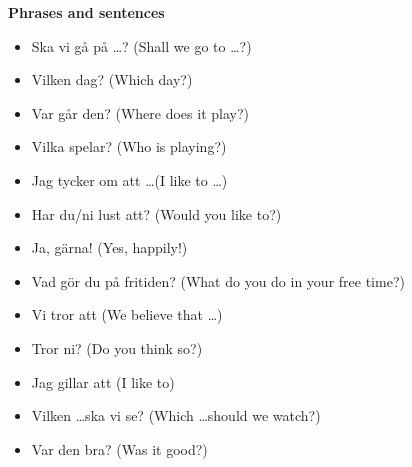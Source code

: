 
\begin{flushleft}
    \textbf{Phrases and sentences}
    \begin{itemize}
        \item Ska vi gå på \ldots? (Shall we go to \ldots?)
        \item Vilken dag? (Which day?)
        \item Var går den? (Where does it play?)
        \item Vilka spelar? (Who is playing?)
        \item Jag tycker om att \ldots (I like to \ldots)
        \item Har du/ni lust att? (Would you like to?)
        \item Ja, gärna! (Yes, happily!)
        \item Vad gör du på fritiden? (What do you do in your free time?)
        \item Vi tror att (We believe that \ldots)
        \item Tror ni? (Do you think so?)
        \item Jag gillar att (I like to)
        \item Vilken \ldots ska vi se? (Which \ldots should we watch?)
        \item Var den bra? (Was it good?)
    \end{itemize}
\end{flushleft}

